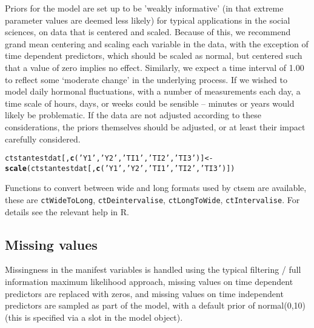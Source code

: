 \documentclass[11pt]{article}\usepackage[]{graphicx}\usepackage[]{color}
\makeatletter
\newcommand{\hlstr}[1]{\textcolor[rgb]{0.192,0.494,0.8}{#1}}%
\newcommand{\hlstd}[1]{\textcolor[rgb]{0.345,0.345,0.345}{#1}}%
\newcommand{\hlkwb}[1]{\textcolor[rgb]{0.69,0.353,0.396}{#1}}%
\newcommand{\hlkwd}[1]{\textcolor[rgb]{0.737,0.353,0.396}{\textbf{#1}}}%
\newenvironment{kframe}{%
 \def\at@end@of@kframe{}%
 \ifinner\ifhmode%
  \def\at@end@of@kframe{\end{minipage}}%
  \begin{minipage}{\columnwidth}%
 \fi\fi%
 \def\FrameCommand##1{\hskip\@totalleftmargin \hskip-\fboxsep
 \colorbox{shadecolor}{##1}\hskip-\fboxsep
     \hskip-\linewidth \hskip-\@totalleftmargin \hskip\columnwidth}%
 \MakeFramed {\advance\hsize-\width
   \@totalleftmargin\z@ \linewidth\hsize
   \@setminipage}}%
 {\par\unskip\endMakeFramed%
 \at@end@of@kframe}
\newenvironment{knitrout}{}{} %
\makeatother
\begin{document}
Priors for the model are set up to be 'weakly informative' (in that extreme parameter values are deemed less likely) for typical applications in the social sciences, on data that is centered and scaled. Because of this, we recommend grand mean centering and scaling each variable in the data, with the exception of time dependent predictors, which should be scaled as normal, but centered such that a value of zero implies no effect. Similarly, we expect a time interval of 1.00 to reflect some `moderate change' in the underlying process. If we wished to model daily hormonal fluctuations, with a number of measurements each day, a time scale of hours, days, or weeks could be sensible -- minutes or years would likely be problematic. If the data are not adjusted according to these considerations, the priors themselves should be adjusted, or at least their impact carefully considered. 

\begin{knitrout}\small
{}\color{fgcolor}\begin{kframe}
\begin{alltt}
\hlstd{ctstantestdat[,}\hlkwd{c}\hlstd{(}\hlstr{'Y1'}\hlstd{,}\hlstr{'Y2'}\hlstd{,}\hlstr{'TI1'}\hlstd{,}\hlstr{'TI2'}\hlstd{,}\hlstr{'TI3'}\hlstd{)]} \hlkwb{<-}
 \hlkwd{scale}\hlstd{(ctstantestdat[,}\hlkwd{c}\hlstd{(}\hlstr{'Y1'}\hlstd{,}\hlstr{'Y2'}\hlstd{,}\hlstr{'TI1'}\hlstd{,}\hlstr{'TI2'}\hlstd{,}\hlstr{'TI3'}\hlstd{)])}
\end{alltt}
\end{kframe}
\end{knitrout}

Functions to convert between wide and long formats used by ctsem are available, these are \verb}ctWideToLong}, \verb}ctDeintervalise}, \verb}ctLongToWide}, \verb}ctIntervalise}. For details see the relevant help in R.

\subsection{Missing values}
Missingness in the manifest variables is handled using the typical filtering / full information maximum likelihood approach, missing values on time dependent predictors are replaced with zeros, and missing values on time independent predictors are sampled as part of the model, with a default prior of normal(0,10) (this is specified via a slot in the model object).
\end{document}
